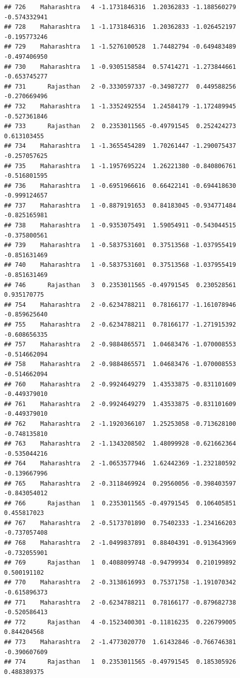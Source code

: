 \documentclass[
]{article}
\begin{document}
\begin{verbatim}
## 726    Maharashtra   4 -1.1731846316  1.20362833 -1.188560279 -0.574332941
## 728    Maharashtra   1 -1.1731846316  1.20362833 -1.026452197 -0.195773246
## 729    Maharashtra   1 -1.5276100528  1.74482794 -0.649483489 -0.497406950
## 730    Maharashtra   1 -0.9305158584  0.57414271 -1.273844661 -0.653745277
## 731      Rajasthan   2 -0.3330597337 -0.34987277  0.449588256 -0.270669496
## 732    Maharashtra   1 -1.3352492554  1.24584179 -1.172489945 -0.527361846
## 733      Rajasthan   2  0.2353011565 -0.49791545  0.252424273  0.613103455
## 734    Maharashtra   1 -1.3655454289  1.70261447 -1.290075437 -0.257057625
## 735    Maharashtra   1 -1.1957695224  1.26221380 -0.840806761 -0.516801595
## 736    Maharashtra   1 -0.6951966616  0.66422141 -0.694418630 -0.999124657
## 737    Maharashtra   1 -0.8879191653  0.84183045 -0.934771484 -0.825165981
## 738    Maharashtra   1 -0.9353075491  1.59054911 -0.543044515 -0.375800561
## 739    Maharashtra   1 -0.5837531601  0.37513568 -1.037955419 -0.851631469
## 740    Maharashtra   1 -0.5837531601  0.37513568 -1.037955419 -0.851631469
## 746      Rajasthan   3  0.2353011565 -0.49791545  0.230528561  0.935170775
## 754    Maharashtra   2 -0.6234788211  0.78166177 -1.161078946 -0.859625640
## 755    Maharashtra   2 -0.6234788211  0.78166177 -1.271915392 -0.608656335
## 757    Maharashtra   2 -0.9884865571  1.04683476 -1.070008553 -0.514662094
## 758    Maharashtra   2 -0.9884865571  1.04683476 -1.070008553 -0.514662094
## 760    Maharashtra   2 -0.9924649279  1.43533875 -0.831101609 -0.449379010
## 761    Maharashtra   2 -0.9924649279  1.43533875 -0.831101609 -0.449379010
## 762    Maharashtra   2 -1.1920366107  1.25253058 -0.713628100 -0.748135810
## 763    Maharashtra   2 -1.1343208502  1.48099928 -0.621662364 -0.535044216
## 764    Maharashtra   2 -1.0653577946  1.62442369 -1.232180592 -0.139667996
## 765    Maharashtra   2 -0.3118469924  0.29560056 -0.398403597 -0.843054012
## 766      Rajasthan   1  0.2353011565 -0.49791545  0.106405851  0.455817023
## 767    Maharashtra   2 -0.5173701890  0.75402333 -1.234166203 -0.737057408
## 768    Maharashtra   2 -1.0499837891  0.88404391 -0.913643969 -0.732055901
## 769      Rajasthan   1  0.4088099748 -0.94799934  0.210199892  0.500191102
## 770    Maharashtra   2 -0.3138616993  0.75371758 -1.191070342 -0.615896373
## 771    Maharashtra   2 -0.6234788211  0.78166177 -0.879682738 -0.520586413
## 772      Rajasthan   4 -0.1523400301 -0.11816235  0.226799005  0.844204568
## 773    Maharashtra   2 -1.4773020770  1.61432846 -0.766746381 -0.390607609
## 774      Rajasthan   1  0.2353011565 -0.49791545  0.185305926  0.488389375

\end{verbatim}
\end{document}
